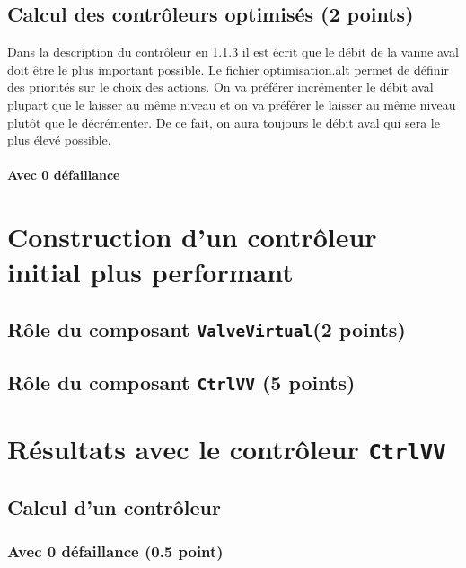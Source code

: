 \documentclass[a4paper]{book}
\begin{document}
\subsection{Calcul des contrôleurs optimisés (2 points)}

Dans la description du contrôleur en 1.1.3 il est écrit que le débit de la vanne aval doit être le plus important possible.
Le fichier optimisation.alt permet de définir des priorités sur le choix des actions. On va préférer incrémenter le débit aval plupart que le laisser au même niveau et on va préférer le laisser au même niveau plutôt que le décrémenter. De ce fait, on aura toujours le débit aval qui sera le plus élevé possible.
\paragraph{Avec 0 défaillance}


\section{Construction d'un contrôleur initial plus performant}
\subsection{Rôle du composant {\tt ValveVirtual}(2 points)}

\subsection{Rôle du composant {\tt CtrlVV} (5 points)}

\section{Résultats avec le contrôleur {\tt CtrlVV}}
\subsection{Calcul d'un contrôleur}
\subsubsection{Avec 0 défaillance (0.5 point)}



%
%
\end{document}
